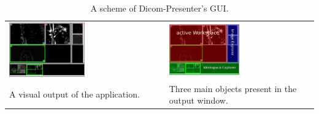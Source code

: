 \begin{table}[ht]
	\captionsetup{tablename=Figures}
	\caption{A scheme of Dicom-Presenter's GUI.\label{dicompresentergui}}
	\centering
	\begin{tabular}{m{} m{}}
			\includegraphics[width=0.5\textwidth]{Text/IMG/GUI_Screenshot.png}
		&
			\includegraphics[width=0.5\textwidth]{Text/IMG/GUI_Screenshot1_English_Label1.png}
		\\
			A visual output of the application. & Three main objects present in the output window.
		\\
		\end{tabular}
\end{table}%